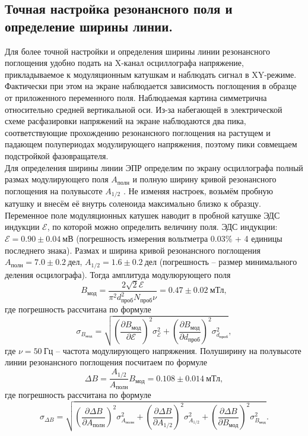 \documentclass[a4paper,12pt]{article}
\begin{document}
\subsection*{Точная настройка резонансного поля и определение ширины линии.}
Для более точной настройки и определения ширины линии резонансного поглощения удобно подать на X-канал осциллографа напряжение, прикладываемое к модуляционным катушкам и наблюдать сигнал в XY-режиме. Фактически при этом на экране наблюдается зависимость поглощения в образце от приложенного переменного поля. Наблюдаемая картина симметрична относительно средней вертикальной оси. Из-за набегающей в электрической схеме расфазировки напряжений на экране наблюдаются два пика, соответствующие прохождению резонансного поглощения на растущем и падающем полупериодах модулирующего напряжения, поэтому пики совмещаем подстройкой фазовращателя.\\
Для определения ширины линии ЭПР определим по экрану осциллографа полный размах
модулирующего поля $A_{\text{полн}}$ и полную ширину кривой резонансного
поглощения на полувысоте $A_{\text{1/2}}$ . Не изменяя настроек, возьмём пробную катушку и внесём её внутрь соленоида максимально близко к образцу. Переменное поле модуляционных катушек наводит в пробной катушке ЭДС индукции $\mathcal{E}$, по которой можно определить величину поля. ЭДС индукции: $\mathcal{E} = 0.90\pm 0.04~\text{мВ}$ (погрешность измерения вольтметра 0.03\% + 4 единицы последнего знака). Размах и ширина кривой резонансного поглощения $A_{\text{полн}} = 7.0 \pm 0.2~\text{дел}$, $A_{\text{1/2}} = 1.6 \pm 0.2~\text{дел}$ (погрешность -- размер минимального деления осцилографа). Тогда амплитуда модулюрующего поля
\[B_{\text{мод}} = \dfrac{2\sqrt{2}\mathcal{E}}{\pi^2 d_{\text{проб}}^2 N_{\text{проб}}\nu} = 0.47 \pm 0.02~\text{мТл},\]
где погрешность рассчитана по формуле
\[\sigma_{B_{\text{мод}}}=\sqrt{\left(\dfrac{\partial B_{\text{мод}}}{\partial \mathcal{E}} \right)^2 \sigma^2_\mathcal{E} + \left(\dfrac{\partial B_{\text{мод}}}{\partial d_{\text{проб}}} \right)^2 \sigma^2_{d_{\text{проб}}}},\]
где $\nu = 50~\text{Гц}$ -- частота модулирующего напряжения. Полуширину на полувысоте линии резонансного поглощения посчитаем по формуле
\[\Delta B = \dfrac{A_{1/2}}{A_{\text{полн}}} B_{\text{мод}} = 0.108 \pm 0.014~\text{мТл},\]
где погрешность рассчитана по формуле
\[\sigma_{\Delta B} = \sqrt{ \left(\dfrac{\partial \Delta B}{\partial A_{\text{полн}}} \right)^2 \sigma^2_{A_{\text{полн}}} +  \left(\dfrac{\partial \Delta B}{\partial A_{\text{1/2}}} \right)^2 \sigma^2_{A_{\text{1/2}}} + \left(\dfrac{\partial \Delta B}{\partial B_{\text{мод}}} \right)^2 \sigma^2_{B_{\text{мод}}} }.\]
\end{document}
